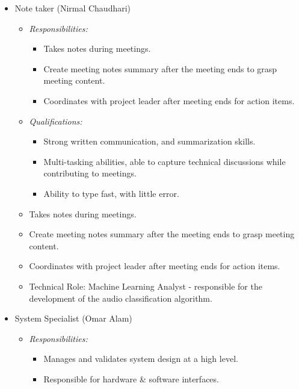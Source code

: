 \documentclass{article}
\begin{document}
\begin{itemize}
\begin{itemize}
      before the deadline.
      \item Technical Role: Design Engineer - responsible for the visual design
      of the system and the design of the user interface and outputs. 
    \end{itemize}
  \item Note taker (Nirmal Chaudhari)\label{role:note_taker}
    \begin{itemize}
      \item \textit{Responsibilities:}
        \begin{itemize}
          \item Takes notes during meetings.
          \item Create meeting notes summary after the meeting ends to grasp
          meeting content.
          \item Coordinates with project leader after meeting ends for action
          items. 
        \end{itemize}
      \item \textit{Qualifications:}
        \begin{itemize}
          \item Strong written communication, and summarization skills. 
          \item Multi-tasking abilities, able to capture technical discussions
          while contributing to meetings. 
          \item Ability to type fast, with little error. 
        \end{itemize}
      \item Takes notes during meetings.
      \item Create meeting notes summary after the meeting ends to grasp meeting
      content.
      \item Coordinates with project leader after meeting ends for action items.
      \item Technical Role: Machine Learning Analyst - responsible for the 
      development of the audio classification algorithm.
    \end{itemize}
  \item System Specialist (Omar Alam)
    \begin{itemize}
      \item \textit{Responsibilities:}
        \begin{itemize}
          \item Manages and validates system design at a high level. 
          \item Responsible for hardware \& software interfaces.

\end{itemize}
\end{itemize}
\end{itemize}
\end{document}
